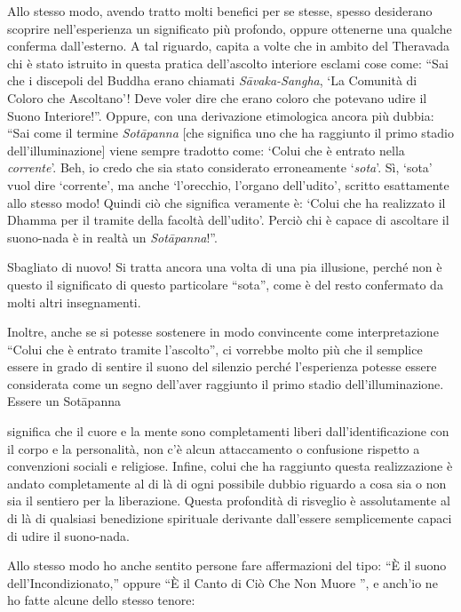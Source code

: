 Allo stesso modo, avendo tratto molti benefici per se stesse, spesso
desiderano scoprire nell'esperienza un significato più profondo, oppure
ottenerne una qualche conferma dall'esterno. A tal riguardo, capita a
volte che in ambito del Theravada chi è stato istruito in questa pratica
dell'ascolto interiore esclami cose come: ``Sai che i discepoli del
Buddha erano chiamati \emph{Sāvaka-Sangha}, `La Comunità di Coloro che
Ascoltano'! Deve voler dire che erano coloro che potevano udire il Suono
Interiore!''. Oppure, con una derivazione etimologica ancora più dubbia:
``Sai come il termine \emph{Sotāpanna} [che significa uno che ha
raggiunto il primo stadio dell'illuminazione] viene sempre tradotto
come: `Colui che è entrato nella \emph{corrente}'. Beh, io credo che sia
stato considerato erroneamente `\emph{sota}'. Sì, `sota' vuol dire
`corrente', ma anche `l'orecchio, l'organo dell'udito', scritto
esattamente allo stesso modo! Quindi ciò che significa veramente è:
`Colui che ha realizzato il Dhamma per il tramite della facoltà
dell'udito'. Perciò chi è capace di ascoltare il suono-nada è in realtà
un \emph{Sotāpanna}!''.

Sbagliato di nuovo! Si tratta ancora una volta di una pia illusione,
perché non è questo il significato di questo particolare ``sota'', come
è del resto confermato da molti altri insegnamenti.\cite{ensinamentos}

Inoltre, anche se si potesse sostenere in modo convincente come
interpretazione ``Colui che è entrato tramite l'ascolto'', ci vorrebbe
molto più che il semplice essere in grado di sentire il suono del
silenzio perché l'esperienza potesse essere considerata come un segno
dell'aver raggiunto il primo stadio dell'illuminazione. Essere un
Sotāpanna

significa che il cuore e la mente sono completamenti liberi
dall'identificazione con il corpo e la personalità, non c'è alcun
attaccamento o confusione rispetto a convenzioni sociali e religiose.
Infine, colui che ha raggiunto questa realizzazione è andato
completamente al di là di ogni possibile dubbio riguardo a cosa sia o
non sia il sentiero per la liberazione. Questa profondità di risveglio è
assolutamente al di là di qualsiasi benedizione spirituale derivante
dall'essere semplicemente capaci di udire il suono-nada.

Allo stesso modo ho anche sentito persone fare affermazioni del tipo:
``È il suono dell'Incondizionato,'' oppure ``È il Canto di Ciò Che Non
Muore '', e anch'io ne ho fatte alcune dello stesso tenore:

